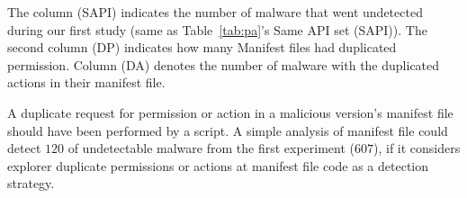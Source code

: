 The column (SAPI) indicates the number of malware that went undetected during our first study (same as Table~\ref{tab:pa}'s Same API set (SAPI)). The second column (DP) indicates how many Manifest files had duplicated permission. Column (DA) denotes the number of malware with the duplicated actions in their manifest file.

A duplicate request for permission or action in a malicious version's manifest file should have been performed by a script. A simple analysis of manifest file could detect $120$ of undetectable malware from the first experiment ($607$), if it considers explorer duplicate permissions or actions at manifest file code as a detection strategy.


